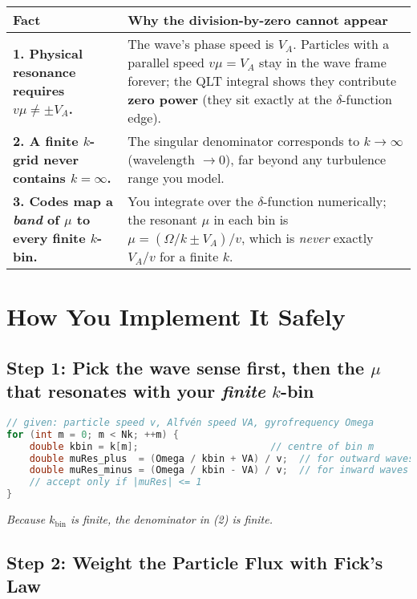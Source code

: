 \begin{table}[h!]
\centering
\begin{tabular}{|p{5cm}|p{9cm}|}
\hline
\textbf{Fact} & \textbf{Why the division-by-zero cannot appear} \\
\hline
\textbf{1. Physical resonance requires $v \mu \neq \pm V_A$.} & The wave’s phase speed is $V_A$. Particles with a parallel speed $v \mu = V_A$ stay in the wave frame forever; the QLT integral shows they contribute \textbf{zero power} (they sit exactly at the $\delta$-function edge). \\
\hline
\textbf{2. A finite $k$-grid never contains $k = \infty$.} & The singular denominator corresponds to $k \to \infty$ (wavelength $\to 0$), far beyond any turbulence range you model. \\
\hline
\textbf{3. Codes map a \textit{band} of $\mu$ to every finite $k$-bin.} & You integrate over the $\delta$-function numerically; the resonant $\mu$ in each bin is $\mu = (\Omega / k \pm V_A)/v$, which is \textit{never} exactly $V_A/v$ for a finite $k$. \\
\hline
\end{tabular}
\end{table}

\section*{How You Implement It Safely}

\subsection*{Step 1: Pick the \textbf{wave sense} first, then the $\mu$ that resonates with your \textit{finite} $k$-bin}

\begin{lstlisting}[language=C++, basicstyle=\ttfamily\small]
// given: particle speed v, Alfvén speed VA, gyrofrequency Omega
for (int m = 0; m < Nk; ++m) {
    double kbin = k[m];                       // centre of bin m
    double muRes_plus  = (Omega / kbin + VA) / v;  // for outward waves
    double muRes_minus = (Omega / kbin - VA) / v;  // for inward waves
    // accept only if |muRes| <= 1
}
\end{lstlisting}

\textit{Because $k_{\text{bin}}$ is finite, the denominator in (2) is finite.}

\subsection*{Step 2: Weight the Particle Flux with \textbf{Fick’s Law}}

